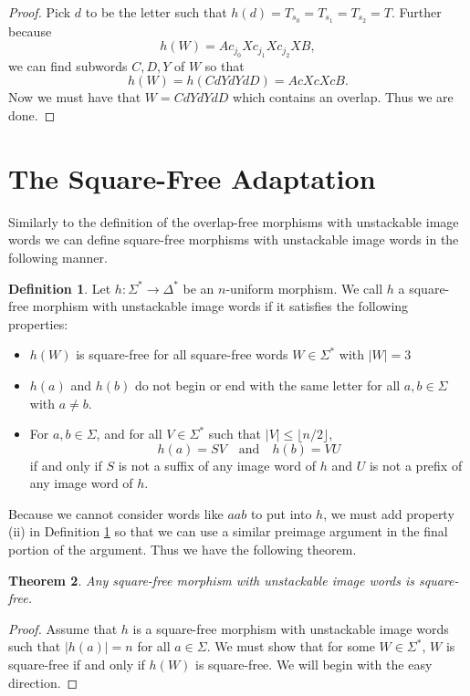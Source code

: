 \documentclass[12pt]{amsart}
\newtheorem{thm}{Theorem}[section]
\theoremstyle{definition}
\newtheorem{defn}[thm]{Definition}
\theoremstyle{plain}
\theoremstyle{nameit}
\theoremstyle{plain}
\begin{document}
\begin{onehalfspace}
\begin{proof}
Pick $d$ to be the letter such that $h(d) = T_{s_0} = T_{s_1} = T_{s_2} = T$. Further because
\[h(W) = Ac_{j_0}Xc_{j_1}Xc_{j_2}XB,\]
we can find subwords $C,D,Y$ of $W$ so that
\[h(W) = h(CdYdYdD) = AcXcXcB.\]
Now we must have that $W = CdYdYdD$ which contains an overlap. Thus we are done.


\end{proof}


\section{The Square-Free Adaptation}

Similarly to the definition of the overlap-free morphisms with unstackable image words we can define
square-free morphisms with unstackable image words in the
following manner.

\begin{defn}
Let $h:\Sigma^*\to\Delta^*$ be an $n$-uniform morphism. We call $h$ a square-free morphism with
unstackable image words if it
satisfies the following properties:
\begin{itemize}
\item[(i)] $h(W)$ is square-free for all square-free words $W\in\Sigma^*$ with $|W| = 3$
\item[(ii)] $h(a)$ and $h(b)$ do not begin or end with the same letter for all $a,b\in\Sigma$ with $a\neq b$.
\item[(iii)] For $a,b\in\Sigma$, and for all $V\in\Sigma^*$ such that $|V|\le\lfloor n/2\rfloor$,
\[h(a) = SV\quad\textrm{and}\quad h(b) = VU\]
if and only if $S$ is not a suffix of any image word of $h$ and $U$ is not a prefix of any image word of $h
$.
\end{itemize}
\label{defn_5_4}
\end{defn}

Because we cannot consider words like $aab$ to put into $h$, we must add property (ii) in Definition \ref{defn_5_4}
so that we can use a similar preimage argument in the final portion of the argument. Thus we have the following
theorem.

\begin{thm}
Any square-free morphism with unstackable image words is square-free.
\label{thm_5_5}
\end{thm}

\begin{proof}
Assume that $h$ is a square-free morphism with unstackable image words such that $|h(a)| = n$ for all $a\in\Sigma$. We must
show that for some $W\in\Sigma^*$, $W$ is square-free if and only if $h(W)$ is square-free. We will begin
with the easy direction.


\end{proof}
\end{onehalfspace}
\end{document}
